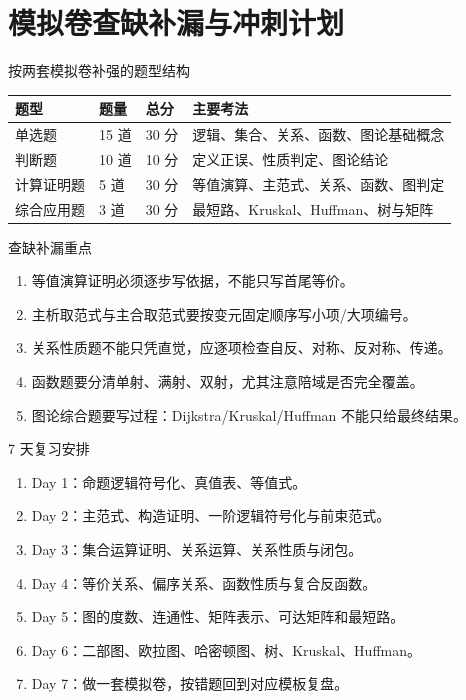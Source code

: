 \documentclass[UTF8,zihao=-4]{ctexart}
\begin{document}
\section{模拟卷查缺补漏与冲刺计划}

\begin{corebox}{按两套模拟卷补强的题型结构}
\begin{center}
\begin{tabular}{p{3.4cm}p{2.2cm}p{2.4cm}p{5.5cm}}
\toprule
题型 & 题量 & 总分 & 主要考法 \\
\midrule
单选题 & 15 道 & 30 分 & 逻辑、集合、关系、函数、图论基础概念 \\
判断题 & 10 道 & 10 分 & 定义正误、性质判定、图论结论 \\
计算证明题 & 5 道 & 30 分 & 等值演算、主范式、关系、函数、图判定 \\
综合应用题 & 3 道 & 30 分 & 最短路、Kruskal、Huffman、树与矩阵 \\
\bottomrule
\end{tabular}
\end{center}
\end{corebox}

\begin{pitfallbox}{查缺补漏重点}
\begin{enumerate}
  \item 等值演算证明必须逐步写依据，不能只写首尾等价。
  \item 主析取范式与主合取范式要按变元固定顺序写小项/大项编号。
  \item 关系性质题不能只凭直觉，应逐项检查自反、对称、反对称、传递。
  \item 函数题要分清单射、满射、双射，尤其注意陪域是否完全覆盖。
  \item 图论综合题要写过程：Dijkstra/Kruskal/Huffman 不能只给最终结果。
\end{enumerate}
\end{pitfallbox}

\begin{methodbox}{7 天复习安排}
\begin{enumerate}
  \item Day 1：命题逻辑符号化、真值表、等值式。
  \item Day 2：主范式、构造证明、一阶逻辑符号化与前束范式。
  \item Day 3：集合运算证明、关系运算、关系性质与闭包。
  \item Day 4：等价关系、偏序关系、函数性质与复合反函数。
  \item Day 5：图的度数、连通性、矩阵表示、可达矩阵和最短路。
  \item Day 6：二部图、欧拉图、哈密顿图、树、Kruskal、Huffman。
  \item Day 7：做一套模拟卷，按错题回到对应模板复盘。
\end{enumerate}
\end{methodbox}
\end{document}
